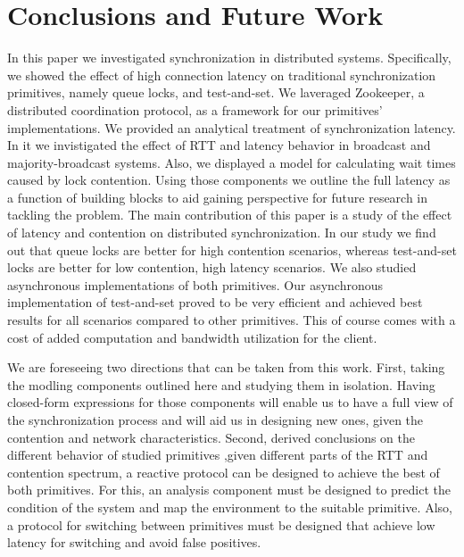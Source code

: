 \section{Conclusions and Future Work}\label{sec:conclusions}
In this paper we investigated synchronization in distributed systems. Specifically, we showed the effect of high connection latency on traditional synchronization primitives, namely queue locks, and test-and-set. We laveraged Zookeeper, a distributed coordination protocol, as a framework for our primitives' implementations. We provided an analytical treatment of synchronization latency. In it we invistigated the effect of RTT and latency behavior in broadcast and majority-broadcast systems. Also, we displayed a model for calculating wait times caused by lock contention. Using those components we outline the full latency as a function of building blocks to aid gaining perspective for future research in tackling the problem. The main contribution of this paper is a study of the effect of latency and contention on distributed synchronization. In our study we find out that queue locks are better for high contention scenarios, whereas test-and-set locks are better for low contention, high latency scenarios. We also studied asynchronous implementations of both primitives. Our asynchronous implementation of test-and-set proved to be very efficient and achieved best results for all scenarios compared to other primitives. This of course comes with a cost of added computation and bandwidth utilization for the client.

We are foreseeing two directions that can be taken from this work. First, taking the modling components outlined here and studying them in isolation. Having closed-form expressions for those components will enable us to have a full view of the synchronization process and will aid us in designing new ones, given the contention and network characteristics. Second, derived conclusions on the different behavior of studied primitives ,given different parts of the RTT and contention spectrum, a reactive protocol can be designed to achieve the best of both primitives. For this, an analysis component must be designed to predict the condition of the system and map the environment to the suitable primitive. Also, a protocol for switching between primitives must be designed that achieve low latency for switching and avoid false positives.

